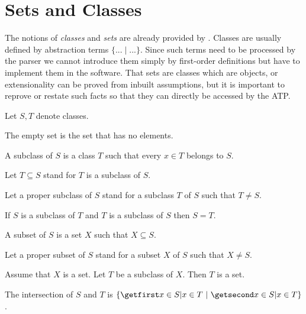 \documentclass{article}
\begin{document}
\section{Sets and Classes}

The notions of \textit{classes} and \textit{sets} are already
provided by \Naproche. Classes are usually defined by
abstraction terms $\{ ... \mid ... \}$. Since such terms need to be
processed by the parser we cannot introduce them simply by first-order
definitions but have to implement them in the software.
That sets are classes which are objects, or extensionality can be proved
from inbuilt assumptions, but it is important to reprove or restate such
facts so that they can directly be accessed by the ATP.

\begin{forthel}
  Let $S, T$ denote classes.

  \begin{definition}
    The empty set is the set that has no elements.
  \end{definition}

  \begin{definition}
    A subclass of $S$ is a class $T$ such that every $x \in T$ belongs to $S$.
  \end{definition}

  Let $T \subseteq S$ stand for $T$ is a subclass of $S$.

  Let a proper subclass of $S$ stand for a subclass $T$ of $S$ such that $T \neq
  S$.

  \begin{lemma}
    If $S$ is a subclass of $T$ and $T$ is a subclass of $S$ then $S = T$.
  \end{lemma}

  \begin{definition}
    A subset of $S$ is a set $X$ such that $X \subseteq S$.
  \end{definition}

  Let a proper subset of $S$ stand for a subset $X$ of $S$ such that $X \neq S$.

  \begin{axiom}
    Assume that $X$ is a set.
    Let $T$ be a subclass of $X$.
    Then $T$ is a set.
  \end{axiom}

  \begin{definition}
    The intersection of $S$ and $T$ is $\class{x \in S | x \in T}$.
  \end{definition}


\end{forthel}
\end{document}
